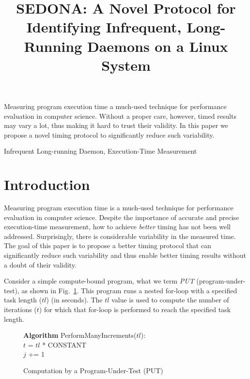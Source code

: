 \documentclass[letter]{ieice}
\title{SEDONA: A Novel Protocol for Identifying Infrequent, Long-Running Daemons on a Linux System}
\begin{document}
\maketitle

\begin{summary}
{\color{blue}Measuring program execution time 
a \hbox{much-used} technique for performance evaluation in computer science. 
Without a proper care, however, timed results may vary a lot, 
thus making it hard to trust their validity. 
In this paper we propose a novel timing protocol to significantly 
reduce such variability.}

\end{summary}
\begin{keywords}
Infrequent Long-running Daemon, Execution-Time Measurement
\end{keywords}

\section{Introduction}
\label{sec:intro}

Measuring program execution time is a much-used
technique for performance evaluation in computer science. 
Despite the importance of accurate and precise execution-time measurement, 
how to achieve {\em better} timing has not been well addressed. 
Surprisingly, there is considerable variability in the measured time.
{\color{red} The goal of this paper is to propose
a better timing protocol that can significantly reduce such variability 
and thus enable better timing results without a doubt of their validity.}

Consider a simple compute-bound program, what we term {\em PUT} (program-under-test), 
as shown in Fig.~\ref{alg:put}. 
This program runs a nested for-loop with a specified task length ($tl$) (in seconds). 
{\color{blue}The $tl$ value is used to compute 
the number of iterations ($t$) for which that for-loop is performed 
to reach the specified task length.}

\vspace{-.2in}
\begin{figure}[h]
\begin{center}
\begin{algorithmic}
{\bf Algorithm} PerformManyIncrements($tl$): \\
\STATE $t$ = $tl$ * {CONSTANT} \\
		\STATE $j$ += 1 \\
	\ENDFOR 
\ENDFOR 
\end{algorithmic}
\end{center}
\caption{Computation by a Program-Under-Test (PUT)\label{alg:put}}
\vspace{-.2in}
\end{figure}
\end{document}
